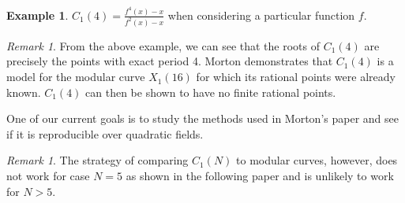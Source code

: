 \documentclass{amsart}
\theoremstyle{plain}
\theoremstyle{definition}
\newtheorem{example}[theorem]{Example}
\theoremstyle{remark}
\newtheorem{remark}[theorem]{Remark}
\begin{document}
\begin{example}
	$C_1(4) = \frac{f^4(x) - x}{f^2(x) - x}$ when considering a 
	particular function $f$.
\end{example}

\begin{remark}
	From the above example, we can see that the roots of $C_1(4)$ are 
	precisely the points with exact period 4. Morton demonstrates 
	that $C_1(4)$ is a model for the modular curve $X_1(16)$ for 
	which its rational points were already known. $C_1(4)$ can then 
	be shown to have no finite rational points.
	
	One of our current goals is to study the methods used in Morton's 
	paper and see if it is reproducible over quadratic fields.
\end{remark}

\begin{remark}
	The strategy of comparing $C_1(N)$ to modular curves, however, 
	does not work for case $N = 5$ as shown in the following paper 
	and is unlikely to work for $N > 5$.
\end{remark}
\end{document}
